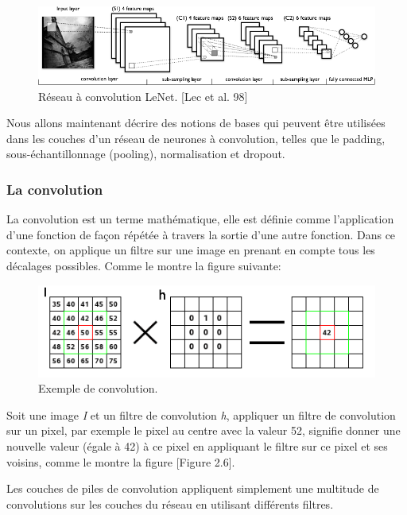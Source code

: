 \begin{figure}[H]
	\centering
		\includegraphics[width=5in]{Figures/Mylenet.png}
	\caption[An Electron]{Réseau à convolution LeNet. [Lec et al. 98]}
	\label{fig:Electron}
\end{figure}

	Nous allons maintenant décrire des notions de bases qui peuvent être utilisées dans les couches d'un réseau de neurones à convolution, telles que le padding, sous-échantillonnage (pooling), normalisation et dropout.

\subsubsection{La convolution}
	
	La convolution est un terme mathématique, elle est définie comme l'application d'une fonction de façon répétée à travers la sortie d'une autre fonction. Dans ce contexte, on applique un filtre sur une image en prenant en compte tous les décalages possibles. Comme le montre la figure suivante:


\begin{figure}[H]
	\centering
		\includegraphics[width=5in]{Figures/convExample.png}
	\caption[An Electron]{Exemple de convolution.}
	\label{fig:Electron}
\end{figure}

	Soit une image \textit{I} et un filtre de convolution \textit{h}, appliquer un filtre de convolution sur un pixel, par exemple le pixel au centre avec la valeur 52, signifie donner une nouvelle valeur (égale à 42) à ce pixel en appliquant le filtre sur ce pixel et ses voisins, comme le montre la figure [Figure 2.6].
	
	Les couches de piles de convolution appliquent simplement une multitude de convolutions sur les couches du réseau en utilisant différents filtres.

